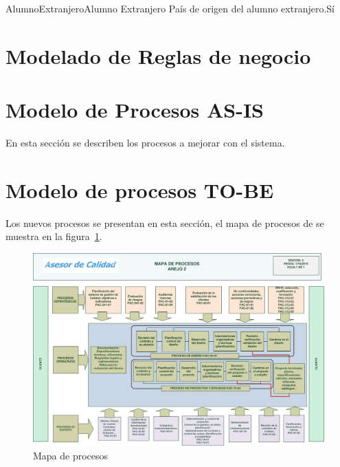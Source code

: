 \begin{cdtEntidad}{AlumnoExtranjero}{Alumno Extranjero}%
		{País de origen del alumno extranjero.}{Sí}
	\cdtEntityRelSection
\end{cdtEntidad}

\section{Modelado de Reglas de negocio}



\section{Modelo de Procesos AS-IS}

En esta sección se describen los procesos a mejorar con el sistema.



%
%

\section{Modelo de procesos TO-BE}

Los nuevos procesos se presentan en esta sección, el mapa de procesos de se muestra en la figura~\ref{fig:mapaProc}.

\begin{figure}[htbp]
	\begin{center}
		\includegraphics[width=.8\textwidth]{images/mapaProc}
		\caption{Mapa de procesos}
		\label{fig:mapaProc}
	\end{center}
\end{figure}



%
%
%

